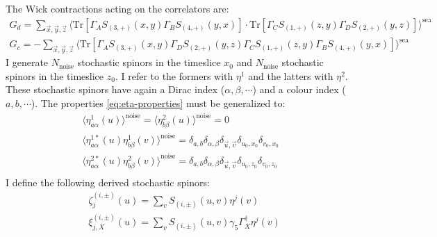 \documentclass[english, LaM, oneside, noexaminfo]{sapthesis}
\begin{document}
\newline
The Wick contractions acting on the correlators are:
\begin{equation}\label{eq:contractions-stochastic-method}
    \begin{gathered}
        G_d = \sum_{\vec x, \vec y, \vec z} \bigg\langle \text{Tr}\left[\Gamma_A S_{(3,+)}(x,y)\Gamma_B S_{(4,+)}(y,x)\right]\cdot\text{Tr}\left[\Gamma_C S_{(1,+)}(z,y)\Gamma_D S_{(2,+)}(y,z)\right] \bigg\rangle^{\text{sea}} \\
        G_c = - \sum_{\vec x, \vec y, \vec z} \bigg\langle \text{Tr}\left[\Gamma_A S_{(3,+)}(x,y)\Gamma_D S_{(2,+)}(y,z)\Gamma_C S_{(1,+)}(z,y)\Gamma_B S_{(4,+)}(y,x)\right] \bigg\rangle^{\text{sea}}
    \end{gathered}
\end{equation}
\newline
I generate $N_{\text{noise}}$ stochastic spinors in the timeslice $x_0$ and $N_{\text{noise}}$ stochastic spinors in the timeslice $z_0$.
I refer to the formers with $\eta^{1}$ and the latters with $\eta^{2}$.
These stochastic spinors have again a Dirac index ($\alpha,\beta,\cdots$) and a colour index ($a,b,\cdots$).
The properties \ref{eq:eta-properties} must be generalized to:
\begin{equation}
    \begin{gathered}
        \langle \eta^{1}_{a\alpha} (u) \rangle^{\text{noise}} = \langle \eta^{2}_{b\beta} (u) \rangle^{\text{noise}} = 0 \\
        \langle \eta^{1*}_{a\alpha} (u) \eta^{1}_{b\beta} (v) \rangle^{\text{noise}} = \delta_{a,b} \delta_{\alpha,\beta} \delta_{\vec u, \vec v} \delta_{u_0,x_0} \delta_{v_0,x_0} \\
        \langle \eta^{2*}_{a\alpha} (u) \eta^{2}_{b\beta} (v) \rangle^{\text{noise}} = \delta_{a,b} \delta_{\alpha,\beta} \delta_{\vec u, \vec v} \delta_{u_0,z_0} \delta_{v_0,z_0} \\
    \end{gathered}
\end{equation}
I define the following derived stochastic spinors:
\begin{equation}
    \begin{aligned}
        & \zeta^{(i,\pm)}_{j} (u) = \sum_{v} S_{(i,\pm)}(u,v)\eta^{j}(v) \\
        & \xi^{(i,\pm)}_{j,X} (u) = \sum_{v} S_{(i,\pm)}(u,v) \gamma_5 \Gamma_X^\dag \eta^{j}(v)
    \end{aligned}
\end{equation}
\end{document}
